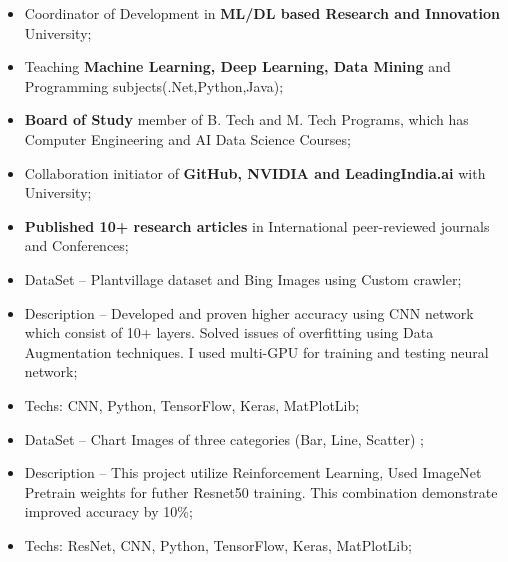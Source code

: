 \documentclass[10pt,a4paper]{altacv}
\begin{document}
\divider
%



\begin{itemize}
  \item Coordinator of Development in \textbf{ML/DL based Research and Innovation} University;   
  \item Teaching \textbf{Machine Learning, Deep Learning, Data Mining} and Programming subjects(.Net,Python,Java);
  \item \textbf{Board of Study} member of B. Tech and M. Tech Programs, which has Computer Engineering and AI Data Science Courses;  
  \item Collaboration initiator of \textbf{GitHub, NVIDIA and LeadingIndia.ai} with University;
  \item \textbf{Published 10+ research articles} in International peer-reviewed journals and Conferences; 
\end{itemize}


\medskip

\clearpage





\begin{itemize}
  \item DataSet -- Plantvillage dataset and Bing Images using Custom crawler;
  \item Description -- Developed and proven higher accuracy using CNN network which consist of 10+ layers. Solved issues of overfitting using Data Augmentation techniques. I used multi-GPU for training and testing neural network;
  \item Techs: CNN, Python, TensorFlow, Keras, MatPlotLib;
\end{itemize}

\divider
\begin{itemize}
  \item DataSet -- Chart Images of three categories (Bar, Line, Scatter) ;
  \item Description -- This project utilize Reinforcement Learning, Used ImageNet Pretrain weights for futher Resnet50 training. This combination demonstrate improved accuracy by 10\%;
  \item Techs: ResNet, CNN, Python, TensorFlow, Keras, MatPlotLib;
\end{itemize}
\end{document}
